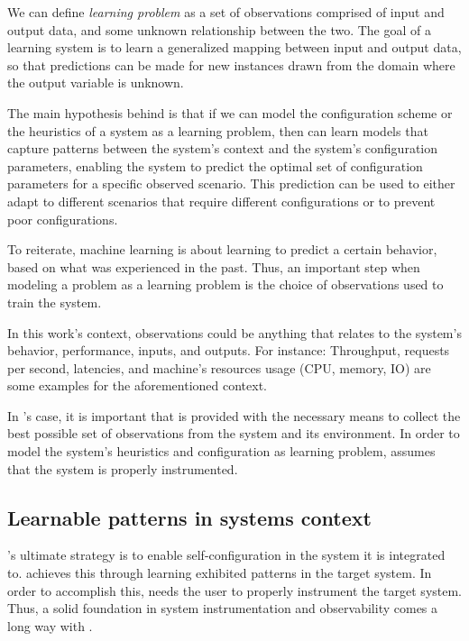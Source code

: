 We can define \emph{learning problem} as a set of observations comprised of input and output data, and some unknown relationship between the two. The goal of a learning system is to learn a generalized mapping between input and output data, so that predictions can be made for new instances drawn from the domain where the output variable is unknown.

The main hypothesis behind \projectname{} is that if we can model the configuration scheme or the heuristics of a system as a learning problem, then \projectname{} can learn models that capture patterns between the system's context and the system's configuration parameters, enabling the system to predict the optimal set of configuration parameters for a specific observed scenario. This prediction can be used to either adapt to different scenarios that require different configurations or to prevent poor configurations.

To reiterate, machine learning is about learning to predict a certain behavior, based on what was experienced in the past. Thus, an important step when modeling a problem as a learning problem is the choice of observations used to train the system.

In this work's context, observations could be anything that relates to the system's behavior, performance, inputs, and outputs. For instance: Throughput, requests per second, latencies, and machine's resources usage (CPU, memory, IO) are some examples for the aforementioned context.

In \projectname{}'s case, it is important that \projectname{} is provided with the necessary means to collect the best possible set of observations from the system and its environment. In order to model the system's heuristics and configuration as learning problem, \projectname{} assumes that the system is properly instrumented.

\subsection{Learnable patterns in systems context}

\projectname{}'s ultimate strategy is to enable self-configuration in the system it is integrated to. \projectname{} achieves this through learning exhibited patterns in the target system. In order to accomplish this, \projectname{} needs the user to properly instrument the target system. Thus, a solid foundation in system instrumentation and observability comes a long way with \projectname{}.

